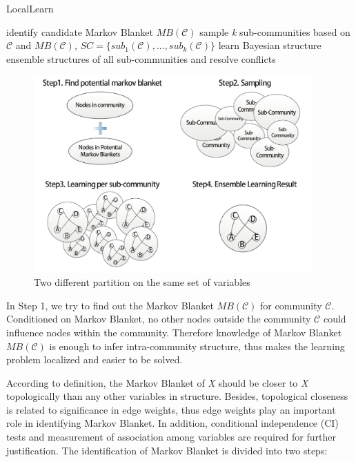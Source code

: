 \begin{algorithm}
\caption{LocalLearn}
\label{alg:learn}
\begin{algorithmic}[1]
    \State identify candidate Markov Blanket $MB(\mathcal {C})$
    \State sample \emph{k} sub-communities based on $\mathcal {C}$ and $MB(\mathcal {C})$, $SC=\{sub_{1}(\mathcal {C}), ..., sub_{k}(\mathcal {C})\}$
        \State learn Bayesian structure
    \EndFor
    \State ensemble structures of all sub-communities and resolve conflicts
\EndFor
\end{algorithmic}
\end{algorithm}

\begin{figure}
\centering
\includegraphics[width=0.95\textwidth]{learn.pdf}
\caption{Two different partition on the same set of variables}
\label{fig:learn}
\end{figure}


In Step 1, we try to find out the Markov Blanket $MB(\mathcal {C})$ for community $\mathcal {C}$. Conditioned on Markov Blanket, no other nodes outside the community $\mathcal {C}$ could influence nodes within the community. Therefore knowledge of Markov Blanket $MB(\mathcal {C})$ is enough to infer intra-community structure, thus makes the learning problem localized and easier to be solved.

According to definition, the Markov Blanket of \emph{X} should be closer to \emph{X} topologically than any other variables in structure. Besides, topological closeness is related to significance in edge weights, thus edge weights play an important role in identifying Markov Blanket. In addition, conditional independence (CI) tests and measurement of association among variables are required for further justification. The identification of Markov Blanket is divided into two steps: \\

